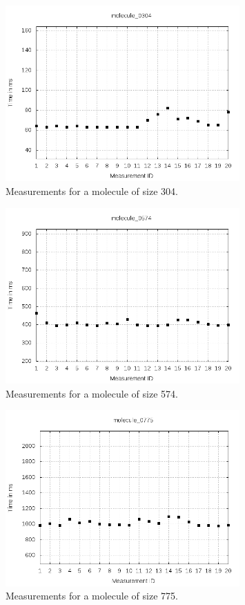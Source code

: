 \documentclass[a4paper,12pt]{article}
\begin{document}
\begin{figure}[!h]
  \centering
    \includegraphics[width=0.8\textwidth]{images/solver-perf-molecule_0304.png}
  \caption{Measurements for a molecule of size 304.}
\end{figure}

\begin{figure}[!h]
  \centering
    \includegraphics[width=0.8\textwidth]{images/solver-perf-molecule_0574.png}
  \caption{Measurements for a molecule of size 574.}
\end{figure}

\begin{figure}[!h]
  \centering
    \includegraphics[width=0.8\textwidth]{images/solver-perf-molecule_0775.png}
  \caption{Measurements for a molecule of size 775.}
\end{figure}
\end{document}
